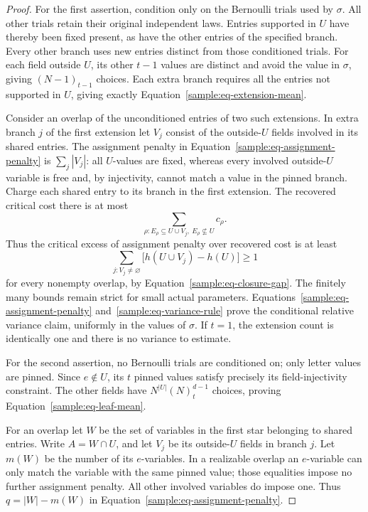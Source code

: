 \begin{proof}
For the first assertion, condition only on the Bernoulli trials used by
$\sigma$.  All other trials retain their original independent laws.
Entries supported in $U$ have thereby been fixed present, as have the
other entries of the specified branch.  Every other branch uses new
entries distinct from those conditioned trials.  For each field outside
$U$, its other $t-1$ values are distinct and avoid the value in
$\sigma$, giving $(N-1)_{t-1}$ choices.  Each extra branch requires
all the entries not supported in $U$, giving exactly
Equation~\eqref{sample:eq-extension-mean}.

Consider an overlap of the unconditioned entries of two such extensions.
In extra branch $j$ of the first extension let $V_j$ consist of the
outside-$U$ fields involved in its shared entries.  The assignment
penalty in Equation~\eqref{sample:eq-assignment-penalty} is
$\sum_j|V_j|$: all $U$-values are fixed, whereas every involved
outside-$U$ variable is free and, by injectivity, cannot match a value
in the pinned branch.  Charge each shared entry to its branch in the
first extension.  The recovered critical cost there is at most
\[
\sum_{\rho:E_\rho\subseteq U\cup V_j,\ E_\rho\not\subseteq U}
c_\rho.
\]
Thus the critical excess of assignment penalty over recovered cost is
at least
\[
\sum_{j:V_j\ne\varnothing}
 \bigl[h(U\cup V_j)-h(U)\bigr]\geq1
\]
for every nonempty overlap, by
Equation~\eqref{sample:eq-closure-gap}.  The finitely many bounds remain
strict for small actual parameters.  Equations~\eqref{sample:eq-assignment-penalty}
and~\eqref{sample:eq-variance-rule} prove the conditional relative
variance claim, uniformly in the values of $\sigma$.  If $t=1$, the
extension count is identically one and there is no variance to estimate.

For the second assertion, no Bernoulli trials are conditioned on;
only letter values are pinned.  Since $e\notin U$, its $t$ pinned
values satisfy precisely its field-injectivity constraint.  The other
fields have $N^{|U|}(N)_t^{d-1}$ choices, proving
Equation~\eqref{sample:eq-leaf-mean}.

For an overlap let $W$ be the set of variables in the first star
belonging to shared entries.  Write $A=W\cap U$, and let $V_j$ be
its outside-$U$ fields in branch $j$.  Let $m(W)$ be the number of its
$e$-variables.  In a realizable overlap an $e$-variable can only match
the variable with the same pinned value; those equalities impose no
further assignment penalty.  All other involved variables do impose
one.  Thus $q=|W|-m(W)$ in
Equation~\eqref{sample:eq-assignment-penalty}.


\end{proof}
